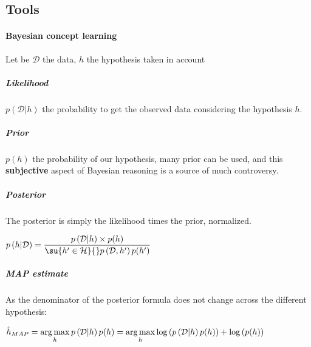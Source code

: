 \subsection{Tools}

\paragraph{Bayesian concept learning}
Let be $\mathcal{D}$ the data, $h$ the hypothesis taken in account
\subparagraph{Likelihood}
$p\left(\mathcal{D}|h\right)$ the probability to get the observed data considering the 
hypothesis $h$.
\subparagraph{Prior}
$p(h)$ the probability of our hypothesis, many prior can be used, and this 
\textbf{subjective} aspect of Bayesian reasoning is a source of much controversy.

\subparagraph{Posterior}
The posterior is simply the likelihood times the prior, normalized.
\begin{center}
$p\left(h|\mathcal{D}\right) = \dfrac{p\left(\mathcal{D}|h\right)\times p(h)}{
    \su{h'\in\mathcal{H}}{}p\left(\mathcal{D}, h'\right)p(h')
}$
\end{center}
\subparagraph{MAP estimate}
As the denominator of the posterior formula does not change across the different 
hypothesis:
\begin{center}
    $\hat{h}_{MAP} = \displaystyle\operatorname*{arg\,max}_{h} p\left(\mathcal{D}|h\right)p(h) = 
    \displaystyle\operatorname*{arg\,max}_{h} \log\left(p\left(\mathcal{D}|h\right)p(h)\right) + \log\left(
       p(h)\right)
    $
\end{center}



